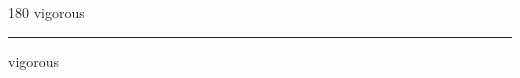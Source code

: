 
\begin{frame}
\begin{center}
\begin{turn}{180}
{\fontsize{2.5cm}{1em}\selectfont vigorous}
\end{turn}
\vspace{1em}\par  
\hrule
\vspace{1em}\par  
{\fontsize{2.5cm}{1em}\selectfont vigorous}
\end{center}
\end{frame}

